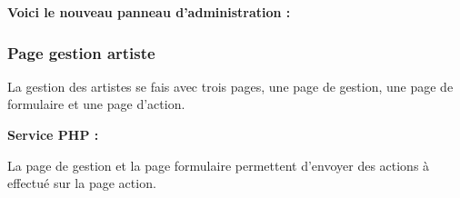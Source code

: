             
            \begin{paragraphe}
                \textbf{Voici le nouveau panneau d'administration :}
            \end{paragraphe}
            
            
    \clearpage

		\subsubsection{Page gestion artiste}
        
            \begin{paragraphe}
                La gestion des artistes se fais avec trois pages, une page de gestion, une page de formulaire et une page d'action.
            \end{paragraphe}

			\begin{paragraphe}
				\textbf{Service PHP :}
			\end{paragraphe}

			\begin{paragraphe}
                La page de gestion et la page formulaire permettent d'envoyer des actions à effectué sur la page action.
			\end{paragraphe}

